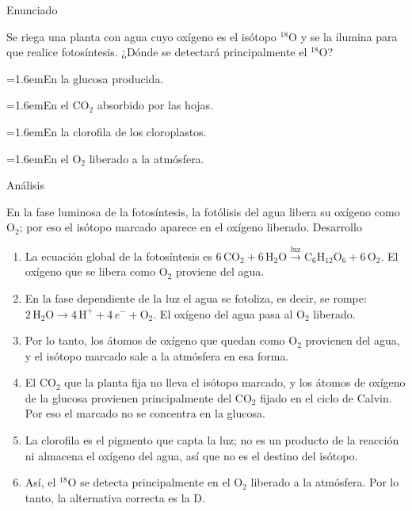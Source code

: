\documentclass[10pt,a4paper,twocolumn]{article}
\newcommand{\alternativa}[2]{\par\noindent\hangindent=1.6em\hangafter=1\makebox[1.6em][l]{\tecla{#1}}#2\par}
\newcommand{\clave}[1]{\par\smallskip{\sffamily\footnotesize\color{esmeralda} Clave \teclaok{#1}}\par}
\begin{document}
\begin{ejemplo}
{\sffamily\footnotesize\color{zinc500} Enunciado}\par
Se riega una planta con agua cuyo oxígeno es el isótopo $^{18}\mathrm{O}$ y se la ilumina para que realice fotosíntesis. ¿Dónde se detectará principalmente el $^{18}\mathrm{O}$?
\alternativa{A}{En la glucosa producida.}
\alternativa{B}{En el $\mathrm{CO_2}$ absorbido por las hojas.}
\alternativa{C}{En la clorofila de los cloroplastos.}
\alternativa{D}{En el $\mathrm{O_2}$ liberado a la atmósfera.}
\clave{D}
{\sffamily\footnotesize\color{zinc500} Análisis}\par En la fase luminosa de la fotosíntesis, la fotólisis del agua libera su oxígeno como $\mathrm{O_2}$; por eso el isótopo marcado aparece en el oxígeno liberado.
{\sffamily\footnotesize\color{zinc500} Desarrollo}
\begin{enumerate}
  \item La ecuación global de la fotosíntesis es $6\,\mathrm{CO_2} + 6\,\mathrm{H_2O} \xrightarrow{\text{luz}} \mathrm{C_6H_{12}O_6} + 6\,\mathrm{O_2}$. El oxígeno que se libera como $\mathrm{O_2}$ proviene del agua.
  \item En la fase dependiente de la luz el agua se fotoliza, es decir, se rompe: $2\,\mathrm{H_2O} \rightarrow 4\,\mathrm{H^+} + 4\,e^- + \mathrm{O_2}$. El oxígeno del agua pasa al $\mathrm{O_2}$ liberado.
  \item Por lo tanto, los átomos de oxígeno que quedan como $\mathrm{O_2}$ provienen del agua, y el isótopo marcado sale a la atmósfera en esa forma.
  \item El $\mathrm{CO_2}$ que la planta fija no lleva el isótopo marcado, y los átomos de oxígeno de la glucosa provienen principalmente del $\mathrm{CO_2}$ fijado en el ciclo de Calvin. Por eso el marcado no se concentra en la glucosa.
  \item La clorofila es el pigmento que capta la luz; no es un producto de la reacción ni almacena el oxígeno del agua, así que no es el destino del isótopo.
  \item Así, el $^{18}\mathrm{O}$ se detecta principalmente en el $\mathrm{O_2}$ liberado a la atmósfera. Por lo tanto, la alternativa correcta es la D.
\end{enumerate}
\end{ejemplo}
\end{document}
